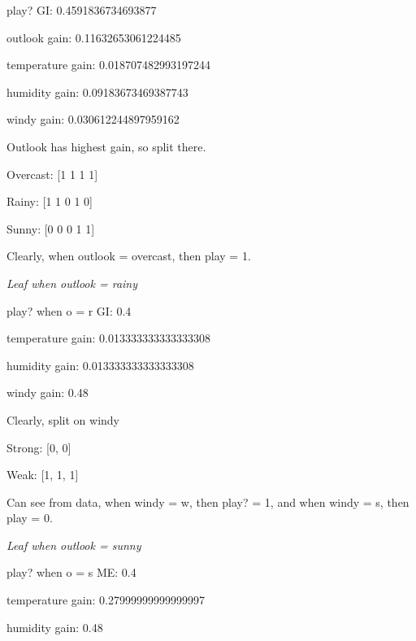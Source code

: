 \documentclass[12pt, fullpage,letterpaper]{article}
\begin{document}
\begin{enumerate}
\begin{enumerate}
	play? GI:  0.4591836734693877
	
    outlook gain: 0.11632653061224485
    
    temperature gain: 0.018707482993197244
    
    humidity gain: 0.09183673469387743
    
    windy gain: 0.030612244897959162
    
    \vspace{5mm}
    
    Outlook has highest gain, so split there.
    
    \vspace{5mm}

    Overcast: [1 1 1 1]

    Rainy: [1 1 0 1 0]

    Sunny: [0 0 0 1 1]

    \vspace{5mm}

    Clearly, when outlook = overcast, then play = 1.
    
    \vspace{5mm}
    
    \emph{Leaf when outlook = rainy}
    
    play? when o = r GI:  0.4
    
    temperature gain: 0.013333333333333308
    
    humidity gain: 0.013333333333333308
    
    windy gain: 0.48
    
    \vspace{5mm}

    Clearly, split on windy
    
    \vspace{5mm}

    Strong: [0, 0]
    
    Weak: [1, 1, 1]
    
    \vspace{5mm}
    
    Can see from data, when windy = w, then play? = 1, and when windy = s, then play = 0.
    
    \vspace{5mm}
    
    \emph{Leaf when outlook = sunny}
    
    play? when o = s ME:  0.4
    
    temperature gain: 0.27999999999999997
    
    humidity gain: 0.48
    

\end{enumerate}
\end{enumerate}
\end{document}
